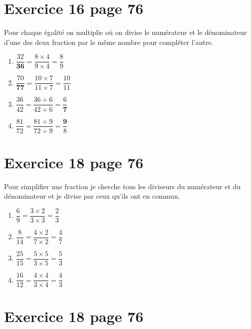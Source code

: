 \documentclass[12pt,a4paper]{article}
\begin{document}
\section*{Exercice 16 page 76}

Pour chaque égalité on multiplie où on divise le numérateur et le dénominateur d'une des deux fraction par le même nombre pour compléter l'autre.
\begin{multicols}{2}
	
	
	\begin{enumerate}
		\item $\dfrac{32}{\mathbf{36}} = \dfrac{8 \times 4}{9 \times 4} = \dfrac{8}{9}$ %
		\item $\dfrac{70}{\mathbf{77}} = \dfrac{10 \times 7}{11 \times 7} = \dfrac{10}{11}$ %
		\item $\dfrac{36}{42} = \dfrac{36 \div 6}{42 \div 6} = \dfrac{6}{\mathbf{7}}$ %
		\item $\dfrac{81}{72} = \dfrac{81 \div 9}{72 \div 9} = \dfrac{\mathbf{9}}{8}$ %
	\end{enumerate}
	
\end{multicols}


\section*{Exercice 18 page 76}

Pour simplifier une fraction je cherche tous les diviseurs du numérateur et du dénominateur et je divise par ceux qu'ils ont en commun.
\begin{multicols}{2}
	
	
	\begin{enumerate}
		\item $\dfrac{6}{9} = \dfrac{3 \times 2}{3 \times 3} = \dfrac{2}{3}$ 
		\item $\dfrac{8}{14} = \dfrac{4 \times 2}{7 \times 2} = \dfrac{4}{7}$ 
		\item $\dfrac{25}{15} = \dfrac{5 \times 5}{3 \times 5} = \dfrac{5}{3}$ 
		\item $\dfrac{16}{12} = \dfrac{4 \times 4}{3 \times 4} = \dfrac{4}{3}$ 
	\end{enumerate}
	
\end{multicols}


\section*{Exercice 18 page 76}
\end{document}
